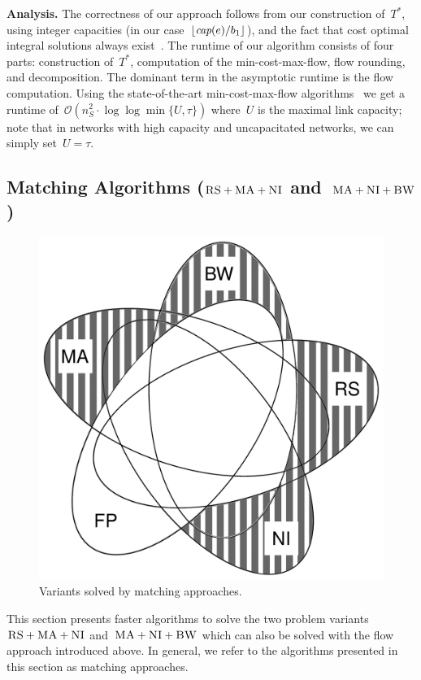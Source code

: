 \documentclass[preprint,12pt]{elsarticle}
\newcommand{\capacity}{\emph{cap}}
\newcommand{\CC}{\textsc{NI}}
\newcommand{\RS}{\textsc{RS}}
\newcommand{\BW}{\textsc{BW}}
\newcommand{\MA}{\textsc{MA}}
\newcommand{\Tree}{\ensuremath{T}}
\newcommand{\CostTrans}{\ensuremath{b_1}}
\begin{document}
\textbf{Analysis.}
The correctness of our approach follows from our construction
of~$\Tree^*$, using integer capacities (in our case~$\lfloor\capacity(e)/\CostTrans\rfloor$),
and the fact that cost optimal integral solutions always exist~\cite{flow-book}.
The runtime of our algorithm consists of four parts: construction of~$\Tree^*$,
computation of the min-cost-max-flow, flow rounding, and decomposition. The
dominant term in the asymptotic runtime is the flow computation.
Using the state-of-the-art min-cost-max-flow
algorithms~\cite{mincostmaxflow-1,mincostmaxflow-2}
we get a runtime of~$\mathcal{O}(n_S^2 \cdot \log\log \min \{U,\tau\})$
where~$U$ is the maximal link capacity; note that in networks with high capacity
and uncapacitated networks, we can simply set~$U=\tau$.


\subsection{Matching Algorithms ($\RS+\MA+\CC$ and~$\MA+\CC+\BW$)}\label{ssec:match}


\begin{figure}[t]
\centering
\includegraphics[width=0.49\columnwidth]{figs/venn_matching.pdf}
\caption{Variants solved by matching approaches.}
\vspace{-1em}
\label{fig:venn_match}
\end{figure}
This section presents faster algorithms to solve 
the two problem variants
$\RS+\MA+\CC$ and~$\MA+\CC+\BW$ which can also be solved with the flow approach
introduced above.
In general, we refer to the algorithms presented in this section
as matching approaches.
\end{document}
